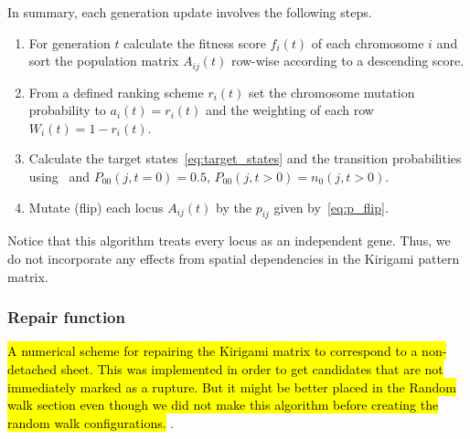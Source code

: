 In summary, each generation update involves the following steps.
\begin{enumerate}
  \item For generation $t$ calculate the fitness score $f_i(t)$ of each chromosome $i$ and sort the population matrix $A_{ij}(t)$ row-wise according to a descending score. 
  \item From a defined ranking scheme $r_i(t)$ set the chromosome mutation probability to $a_i(t) = r_i(t)$ and the weighting of each row $W_i(t) = 1 - r_i(t)$.
  \item Calculate the target states~\cref{eq:target_states} and the transition probabilities using~ and $P_{00}(j, t = 0) = 0.5$, $P_{00}(j,t>0) = n_0(j,t>0)$.
  \item Mutate (flip) each locus $A_{ij}(t)$ by the $p_{ij}$ given by~\cref{eq:p_flip}.
\end{enumerate}
Notice that this algorithm treats every locus as an independent gene. Thus, we do not incorporate any effects from spatial dependencies in the Kirigami pattern matrix.



\subsubsection{Repair function}
\hl{A numerical scheme for repairing the Kirigami matrix to correspond to a non-detached sheet. This was implemented in order to get candidates that are not immediately marked as a rupture. But it might be better placed in the Random walk section even though we did not make this algorithm before creating the random walk configurations.}
.
